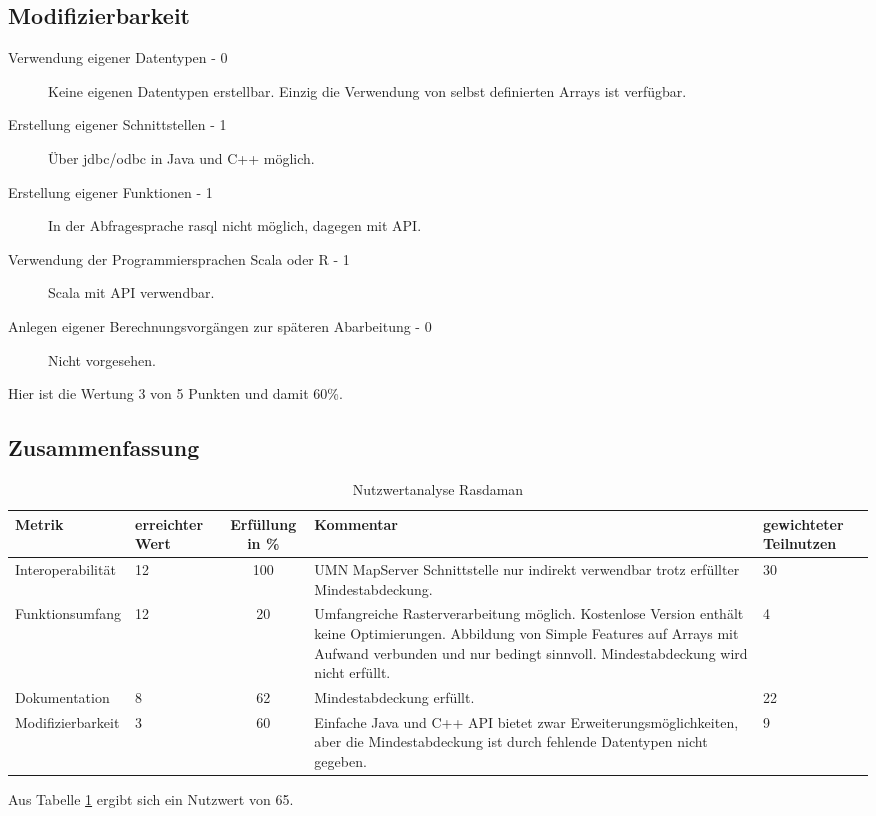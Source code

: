 \subsection{Modifizierbarkeit}
\begin{description}
\item[Verwendung eigener Datentypen - 0] Keine eigenen Datentypen erstellbar. Einzig die Verwendung von selbst definierten Arrays ist verfügbar.
\item[Erstellung eigener Schnittstellen - 1] Über \Gls{jdbc}/\Gls{odbc} in Java und C++ möglich.
\item[Erstellung eigener Funktionen - 1] In der Abfragesprache rasql nicht möglich, dagegen mit API.
\item[Verwendung der Programmiersprachen Scala oder R - 1] Scala mit API verwendbar.
\item[Anlegen eigener Berechnungsvorgängen zur späteren Abarbeitung - 0] Nicht vorgesehen.
\end{description}
Hier ist die Wertung 3 von 5 Punkten und damit 60\%.

\subsection{Zusammenfassung}
\begin{table}[h!]
\centering
\small
\begin{tabular}{l|p{1.8cm}|c|p{3.1cm}|p{1.8cm}}
\textbf{Metrik} & \textbf{erreichter Wert} & \textbf{Erfüllung in \%} & \textbf{Kommentar} & \textbf{gewichteter Teilnutzen} \\ \hline
Interoperabilität & 12 & 100 & UMN MapServer Schnittstelle nur indirekt verwendbar trotz erfüllter Mindestabdeckung. & 30 \\ \hline
Funktionsumfang & 12 & 20 & Umfangreiche Rasterverarbeitung möglich. Kostenlose Version enthält keine Optimierungen. Abbildung von Simple Features auf Arrays mit Aufwand verbunden und nur bedingt sinnvoll. Mindestabdeckung wird nicht erfüllt. & 4 \\ \hline
Dokumentation & 8 & 62 & Mindestabdeckung erfüllt. & 22 \\ \hline
Modifizierbarkeit & 3 & 60 & Einfache Java und C++ API bietet zwar Erweiterungsmöglichkeiten, aber die Mindestabdeckung ist durch fehlende Datentypen nicht gegeben. & 9 \\
\end{tabular}
\caption{Nutzwertanalyse Rasdaman}
\label{table:nutzwertanalyse-rasdaman}
\end{table}
Aus Tabelle \ref{table:nutzwertanalyse-rasdaman} ergibt sich ein Nutzwert von 65.

